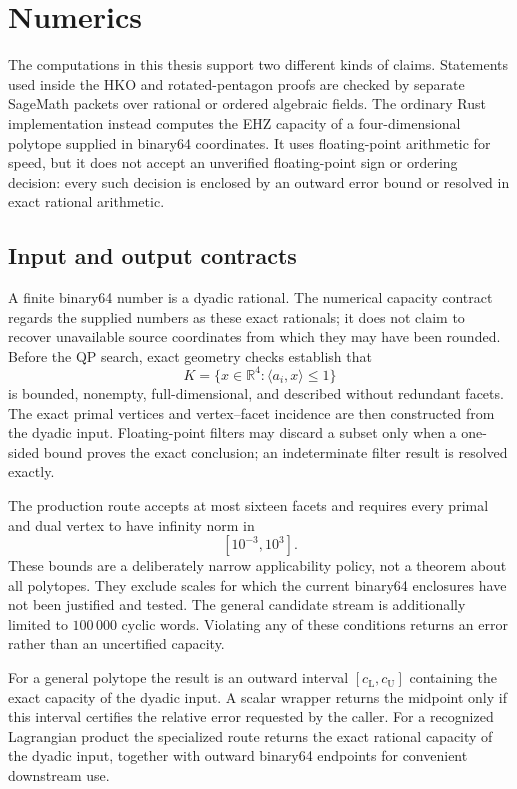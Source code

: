\FloatBarrier
\section{Numerics}\label{sec:numerics}

The computations in this thesis support two different kinds of claims.
Statements used inside the HKO and rotated-pentagon proofs are checked by
separate SageMath packets over rational or ordered algebraic fields.  The
ordinary Rust implementation instead computes the EHZ capacity of a
four-dimensional polytope supplied in binary64 coordinates.  It uses
floating-point arithmetic for speed, but it does not accept an unverified
floating-point sign or ordering decision: every such decision is enclosed by
an outward error bound or resolved in exact rational arithmetic.

\subsection{Input and output contracts}

A finite binary64 number is a dyadic rational.  The numerical capacity
contract regards the supplied numbers as these exact rationals; it does not
claim to recover unavailable source coordinates from which they may have been
rounded.  Before the QP search, exact geometry checks establish that
\[
  K=\{x\in\mathbb{R}^4:\langle a_i,x\rangle\leq1\}
\]
is bounded, nonempty, full-dimensional, and described without redundant
facets.  The exact primal vertices and vertex--facet incidence are then
constructed from the dyadic input.  Floating-point filters may discard a
subset only when a one-sided bound proves the exact conclusion; an
indeterminate filter result is resolved exactly.

The production route accepts at most sixteen facets and requires every primal
and dual vertex to have infinity norm in
\[
  [10^{-3},10^3].
\]
These bounds are a deliberately narrow applicability policy, not a theorem
about all polytopes.  They exclude scales for which the current binary64
enclosures have not been justified and tested.  The general candidate stream
is additionally limited to \(100\,000\) cyclic words.  Violating any of these
conditions returns an error rather than an uncertified capacity.

For a general polytope the result is an outward interval
\([c_{\mathrm L},c_{\mathrm U}]\) containing the exact capacity of the
dyadic input.  A scalar wrapper returns the midpoint only if this interval
certifies the relative error requested by the caller.  For a recognized
Lagrangian product the specialized route returns the exact rational capacity
of the dyadic input, together with outward binary64 endpoints for convenient
downstream use.


